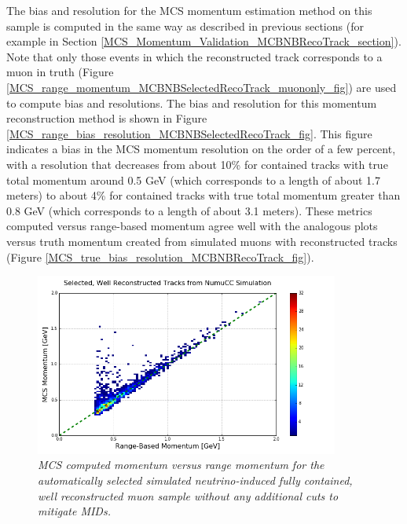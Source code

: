 The bias and resolution for the MCS momentum estimation method on this sample is computed in the same way as described in previous sections (for example in Section \ref{MCS_Momentum_Validation_MCBNBRecoTrack_section}). Note that only those events in which the reconstructed track corresponds to a muon in truth (Figure \ref{MCS_range_momentum_MCBNBSelectedRecoTrack_muononly_fig}) are used to compute bias and resolutions. The bias and resolution for this momentum reconstruction method is shown in Figure \ref{MCS_range_bias_resolution_MCBNBSelectedRecoTrack_fig}. This figure indicates a bias in the MCS momentum resolution on the order of a few percent, with a resolution that decreases from about 10\% for contained tracks with true total momentum around 0.5 GeV (which corresponds to a length of about 1.7 meters) to about 4\% for contained tracks with true total momentum greater than 0.8 GeV (which corresponds to a length of about 3.1 meters). These metrics computed versus range-based momentum agree well with the analogous plots versus truth momentum created from simulated muons with reconstructed tracks (Figure \ref{MCS_true_bias_resolution_MCBNBRecoTrack_fig}).


\begin{figure}[ht!]
\begin{center}
\includegraphics[width=100mm]{Figures/MCS_range_comparison_MCBNBSelectedRecoTrack.png}
\end{center}
\caption{\textit{MCS computed momentum versus range momentum for the automatically selected simulated neutrino-induced fully contained, well reconstructed muon sample without any additional cuts to mitigate MIDs.}}
\label{MCS_range_momentum_MCBNBSelectedRecoTrack_noPDGcut_fig}
\end{figure}

